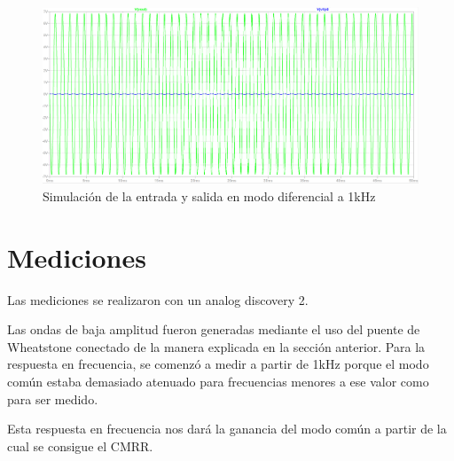 \documentclass[../../tc_tp3_main.tex]{subfiles}
\begin{document}
	\begin{figure}[h!]	
		\centering
		\includegraphics[scale=0.4]{imagenes/ganancia_diferencial_simulado.png}
		\caption{Simulación de la entrada y salida en modo diferencial a 1kHz}
		\label{fig:ej3_ganancia_diferencial_simulado}
	\end{figure}
	
\section{Mediciones}
Las mediciones se realizaron con un analog discovery 2.\par
Las ondas de baja amplitud fueron generadas mediante el uso del puente de Wheatstone conectado de la manera explicada en la sección anterior.
Para la respuesta en frecuencia, se comenzó a medir a partir de 1kHz porque el modo común estaba demasiado atenuado para frecuencias menores a ese valor como para ser medido. \par
Esta respuesta en frecuencia nos dará la ganancia del modo común a partir de la cual se consigue el CMRR.
\end{document}
